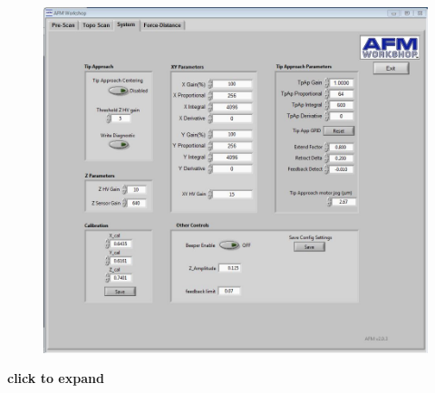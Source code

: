 \documentclass{../lab}
\begin{document}
​
\begin{figure}[h]
    \centering
    \href{http://dev-physicsadv.pantheon.berkeley.edu/sites/default/files/AFMImages/systemtab.JPG}{\includegraphics[width=0.5\linewidth]{images/systemtab.JPG}}
    \caption{}
    \label{fig:systemtab}
\end{figure}

\textbf{click to expand}
\end{document}
